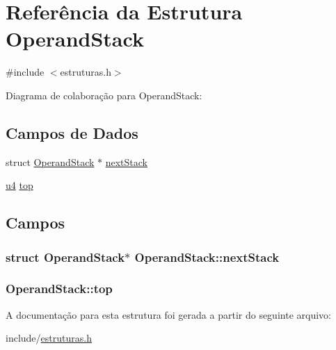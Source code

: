 \hypertarget{struct_operand_stack}{}\section{Referência da Estrutura Operand\+Stack}
\label{struct_operand_stack}


{\ttfamily \#include $<$estruturas.\+h$>$}



Diagrama de colaboração para Operand\+Stack\+:
\subsection*{Campos de Dados}
\begin{DoxyCompactItemize}
\item 
struct \hyperlink{struct_operand_stack}{Operand\+Stack} $\ast$ \hyperlink{struct_operand_stack_a965579f06932f8c57ad8cf660fd0b755}{next\+Stack}
\item 
\hyperlink{estruturas_8h_aedf6ddc03df8caaaccbb4c60b9a9b850}{u4} \hyperlink{struct_operand_stack_a72c72a798cbb9497d5cec0db07b29dac}{top}
\end{DoxyCompactItemize}


\subsection{Campos}
\subsubsection[{\texorpdfstring{next\+Stack}{nextStack}}]{\setlength{\rightskip}{0pt plus 5cm}struct {\bf Operand\+Stack}$\ast$ Operand\+Stack\+::next\+Stack}\hypertarget{struct_operand_stack_a965579f06932f8c57ad8cf660fd0b755}{}\label{struct_operand_stack_a965579f06932f8c57ad8cf660fd0b755}
\subsubsection[{\texorpdfstring{top}{top}}]{ Operand\+Stack\+::top}\hypertarget{struct_operand_stack_a72c72a798cbb9497d5cec0db07b29dac}{}\label{struct_operand_stack_a72c72a798cbb9497d5cec0db07b29dac}


A documentação para esta estrutura foi gerada a partir do seguinte arquivo\+:\begin{DoxyCompactItemize}
\item 
include/\hyperlink{estruturas_8h}{estruturas.\+h}\end{DoxyCompactItemize}

